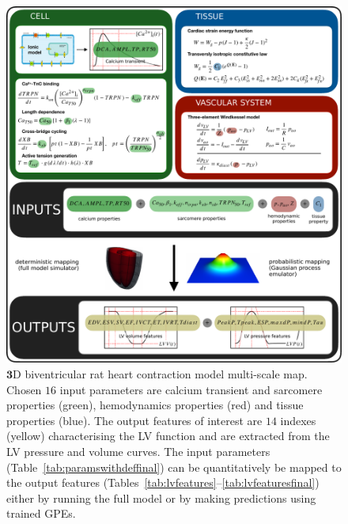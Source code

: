 \begin{figure}[!ht]
    \myfloatalign
    \includegraphics[width=\textwidth]{figures/chapter07/Fig_1.pdf}
    \caption{$\mathbf{3}$D biventricular rat heart contraction model multi-scale map. Chosen $16$ input parameters are calcium transient and sarcomere properties (green), hemodynamics properties (red) and tissue properties (blue). The output features of interest are $14$ indexes (yellow) characterising the LV function and are extracted from the LV pressure and volume curves. The input parameters (Table~\ref{tab:paramswithdeffinal}) can be quantitatively be mapped to the output features (Tables~\ref{tab:lvfeatures}--\ref{tab:lvfeaturesfinal}) either by running the full model or by making predictions using trained GPEs.}
    \label{fig:multiscalemap}
\end{figure}


%
%
%
